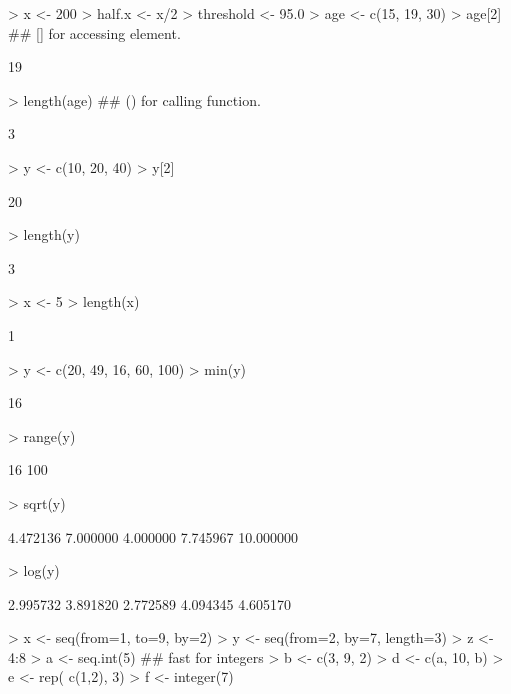 \documentclass[10pt,letterpaper]{article}
\newenvironment{Schunk}{}{}
\begin{document}
\begin{Schunk}
\begin{Sinput}
> x <- 200
> half.x <- x/2
> threshold <- 95.0
> age <- c(15, 19, 30)
> age[2]      ## [] for accessing element.
\end{Sinput}
\begin{Soutput}
[1] 19
\end{Soutput}
\begin{Sinput}
> length(age) ## () for calling function.
\end{Sinput}
\begin{Soutput}
[1] 3
\end{Soutput}
\begin{Sinput}
> y <- c(10, 20, 40)
> y[2]
\end{Sinput}
\begin{Soutput}
[1] 20
\end{Soutput}
\begin{Sinput}
> length(y)
\end{Sinput}
\begin{Soutput}
[1] 3
\end{Soutput}
\begin{Sinput}
> x <- 5
> length(x)
\end{Sinput}
\begin{Soutput}
[1] 1
\end{Soutput}
\begin{Sinput}
> y <- c(20, 49, 16, 60, 100)
> min(y)
\end{Sinput}
\begin{Soutput}
[1] 16
\end{Soutput}
\begin{Sinput}
> range(y)
\end{Sinput}
\begin{Soutput}
[1]  16 100
\end{Soutput}
\begin{Sinput}
> sqrt(y)
\end{Sinput}
\begin{Soutput}
[1]  4.472136  7.000000  4.000000  7.745967 10.000000
\end{Soutput}
\begin{Sinput}
> log(y)
\end{Sinput}
\begin{Soutput}
[1] 2.995732 3.891820 2.772589 4.094345 4.605170
\end{Soutput}
\begin{Sinput}
> x <- seq(from=1, to=9, by=2)
> y <- seq(from=2, by=7, length=3)
> z <- 4:8
> a <- seq.int(5)                ## fast for integers
> b <- c(3, 9, 2)
> d <- c(a, 10, b)
> e <- rep( c(1,2), 3)
> f <- integer(7)
\end{Sinput}
\end{Schunk}
\end{document}
